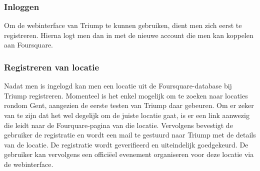\subsubsection{Inloggen}
Om de webinterface van Triump te kunnen gebruiken, dient men zich eerst te registreren. Hierna logt men dan in met de nieuwe account die men kan koppelen aan Foursquare.
\subsubsection{Registreren van locatie}
Nadat men is ingelogd kan men een locatie uit de Foursquare-database bij Triump registreren.
Momenteel is het enkel mogelijk om te zoeken naar locaties rondom Gent, aangezien de eerste testen van Triump daar gebeuren.
Om er zeker van te zijn dat het wel degelijk om de juiste locatie gaat, is er een link aanwezig die leidt naar de Fourquare-pagina van die locatie.
Vervolgens bevestigt de gebruiker de registratie en wordt een mail te gestuurd naar Triump met de details van de locatie. De registratie wordt geverifieerd en uiteindelijk goedgekeurd.
De gebruiker kan vervolgens een officiëel evenement organiseren voor deze locatie via de webinterface.

